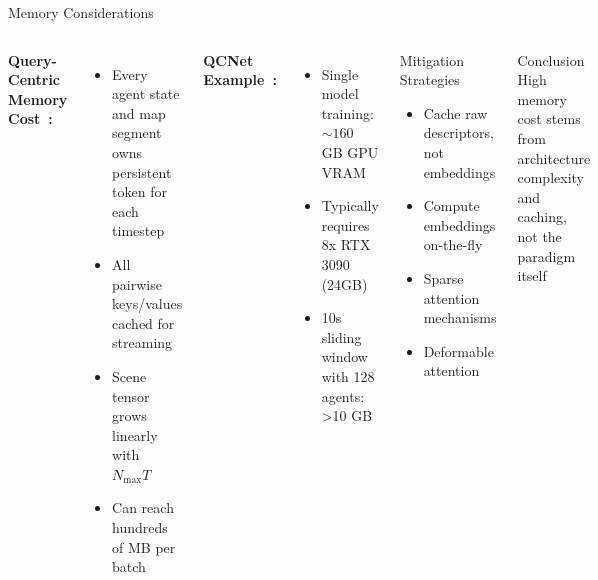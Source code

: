 \documentclass[10pt,aspectratio=169]{beamer}
\begin{document}
\begin{frame}{Memory Considerations}
\begin{columns}[T]
\textbf{Query-Centric Memory Cost~\cite{qcnetZhou2023}:}
\begin{itemize}
    \item Every agent state and map segment owns persistent token for each timestep
    \item All pairwise keys/values cached for streaming
    \item Scene tensor grows linearly with $N_{\max}T$
    \item Can reach hundreds of MB per batch
\end{itemize}

\textbf{QCNet Example~\cite{qcnetZhou2023}:}
\begin{itemize}
    \item Single model training: $\sim 160$ GB GPU VRAM
    \item Typically requires 8x RTX 3090 (24GB)
    \item 10s sliding window with 128 agents: >10 GB
\end{itemize}

\begin{block}{Mitigation Strategies}
\begin{itemize}
    \item Cache raw descriptors, not embeddings
    \item Compute embeddings on-the-fly
    \item Sparse attention mechanisms
    \item Deformable attention
\end{itemize}
\end{block}

\begin{alertblock}{Conclusion~\cite{qcnetZhou2023}}
High memory cost stems from architecture complexity and caching, not the paradigm itself
\end{alertblock}
\end{columns}
\end{frame}
\end{document}
